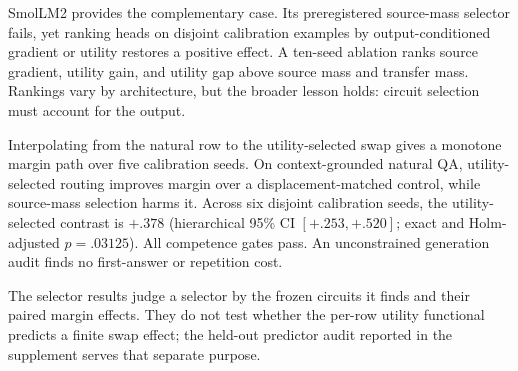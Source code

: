 \documentclass[letterpaper]{article} %
\begin{document}
SmolLM2 provides the complementary case. Its preregistered source-mass selector fails, yet ranking heads on
disjoint calibration examples by output-conditioned gradient or utility restores a positive effect. A ten-seed
ablation ranks source gradient, utility gain, and utility gap above source mass and transfer mass. Rankings vary
by architecture, but the broader lesson holds: circuit selection must account for the output.

Interpolating from the natural row to the utility-selected swap gives a monotone margin path over five
calibration seeds. On context-grounded natural QA, utility-selected routing improves margin over a
displacement-matched control, while source-mass selection harms it. Across six disjoint calibration seeds, the
utility-selected contrast is $+.378$ (hierarchical 95\% CI $[+.253,+.520]$; exact and Holm-adjusted
$p=.03125$). All competence gates pass. An unconstrained generation audit finds no first-answer or repetition
cost.

The selector results judge a selector by the frozen circuits it finds and their paired margin effects. They do
not test whether the per-row utility functional predicts a finite swap effect; the held-out predictor audit
reported in the supplement serves that separate purpose.
\end{document}
